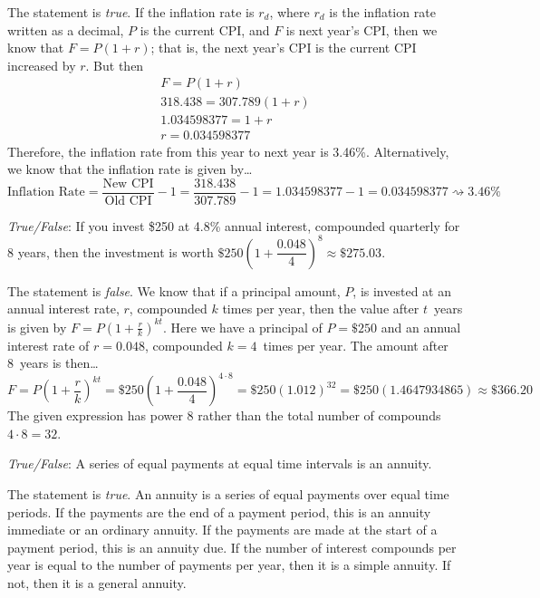 \documentclass[11pt,letterpaper]{article}
\newcommand{\squiggle}{\rightsquigarrow}
\begin{document}
\sol The statement is \textit{true}. If the inflation rate is $r_d$, where $r_d$ is the inflation rate written as a decimal, $P$ is the current CPI, and $F$ is next year's CPI, then we know that $F= P(1 + r)$; that is, the next year's CPI is the current CPI increased by $r$. But then 
	\[
	\begin{gathered}
	F= P(1 + r) \\
	318.438= 307.789(1 + r) \\
	1.034598377= 1 + r \\
	r= 0.034598377
	\end{gathered}
	\]
Therefore, the inflation rate from this year to next year is 3.46\%. Alternatively, we know that the inflation rate is given by\dots
	\[
	\text{Inflation Rate}= \dfrac{\text{New CPI}}{\text{Old CPI}} - 1= \dfrac{318.438}{307.789} - 1= 1.034598377 - 1= 0.034598377 \squiggle 3.46\%
	\] \pvspace{1.3cm}



\quizsol \textit{True/False}: If you invest \$250 at 4.8\% annual interest, compounded quarterly for 8 years, then the investment is worth $\$250 \left(1 + \dfrac{0.048}{4} \right)^8 \approx \$275.03$. \pspace

\sol The statement is \textit{false}. We know that if a principal amount, $P$, is invested at an annual interest rate, $r$, compounded $k$ times per year, then the value after $t$~years is given by $F= P \left(1 + \frac{r}{k} \right)^{kt}$. Here we have a principal of $P= \$250$ and an annual interest rate of $r= 0.048$, compounded $k= 4$~times per year. The amount after 8~years is then\dots
	\[
	F= P \left(1 + \dfrac{r}{k} \right)^{kt}= \$250 \left(1 + \dfrac{0.048}{4} \right)^{4 \cdot 8}= \$250 (1.012)^{32}= \$250 (1.4647934865) \approx \$366.20
	\]
The given expression has power 8 rather than the total number of compounds $4 \cdot 8= 32$. \pvspace{1.3cm}



\quizsol \textit{True/False}: A series of equal payments at equal time intervals is an annuity. \pspace

\sol The statement is \textit{true}. An annuity is a series of equal payments over equal time periods. If the payments are the end of a payment period, this is an annuity immediate or an ordinary annuity. If the payments are made at the start of a payment period, this is an annuity due. If the number of interest compounds per year is equal to the number of payments per year, then it is a simple annuity. If not, then it is a general annuity. \pvspace{1.3cm}
\end{document}
